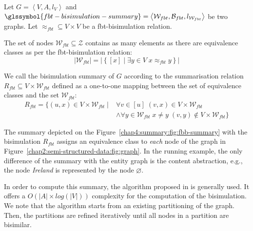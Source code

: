 \begin{definition}
Let $G=\left\langle V, A, l_V \right\rangle$ and $\glssymbol{fbt-bisimulation-summary} = \left\langle \mathcal{W}_{fbt}, \mathcal{B}_{fbt}, l_{\mathcal{W}_{fbt}} \right\rangle$ be two graphs. Let $\approx_{fbt} \subseteq V \times V$ be a fbt-bisimulation relation.

The set of nodes $\mathcal{W}_{fbt} \subseteq \mathcal{Z}$ contains as many elements as there are equivalence classes as per the fbt-bisimulation relation:
$$
\lvert \mathcal{W}_{fbt} \rvert = \lvert \left\lbrace [x] \mid \exists y \in V\; x \approx_{fbt} y \right\rbrace \rvert
$$

We call  the bisimulation summary of $G$ according to the summarisation relation $R_{fbt} \subseteq V \times \mathcal{W}_{fbt}$ defined as a one-to-one mapping between the set of equivalence classes and the set $\mathcal{W}_{fbt}$:
$$
\begin{aligned}
R_{fbt} = \{ \left( u, x \right) \in V \times \mathcal{W}_{fbt} \mid & \forall v \in [u]\; \left( v, x \right) \in V \times \mathcal{W}_{fbt} \\
& \wedge \forall y \in \mathcal{W}_{fbt}\; x \neq y\; (v, y) \not \in V \times \mathcal{W}_{fbt} \}
\end{aligned}
$$
\end{definition}

The summary depicted on the Figure~\ref{chap4:summary:fig:fbb-summary} with the bisimulation $R_{fbt}$ assigns an equivalence class to \emph{each} node of the graph in Figure~\ref{chap2:semi-structured-data:fig:graph}. In the running example, the only difference of the summary with the entity graph is the content abstraction, e.g., the node \emph{Ireland} is represented by the node $\varnothing$.

In order to compute this summary, the algorithm proposed in \cite{Paige:1987:TPR:37185.37186} is generally used. It offers a $O\left( \vert A \vert \times log\left( \vert V \vert \right) \right)$ complexity for the computation of the bisimulation. We note that the algorithm starts from an existing partitioning of the graph. Then, the partitions are refined iteratively until all nodes in a partition are bisimilar.%

